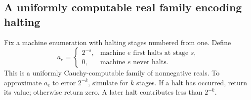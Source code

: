 \documentclass[11pt,letterpaper]{article}
\numberwithin{equation}{section}
\theoremstyle{definition}
\theoremstyle{remark}
\begin{document}
\subsection{A uniformly computable real family encoding halting}

Fix a machine enumeration with halting stages numbered from one. Define
\begin{equation}\label{eq:ae}
 a_e=\begin{cases}
 2^{-s},&\text{machine }e\text{ first halts at stage }s,\\
 0,&\text{machine }e\text{ never halts}.
 \end{cases}
\end{equation}
This is a uniformly Cauchy-computable family of nonnegative reals. To
approximate $a_e$ to error $2^{-k}$, simulate for $k$ stages. If a halt has
occurred, return its value; otherwise return zero. A later halt contributes
less than $2^{-k}$.
\end{document}
